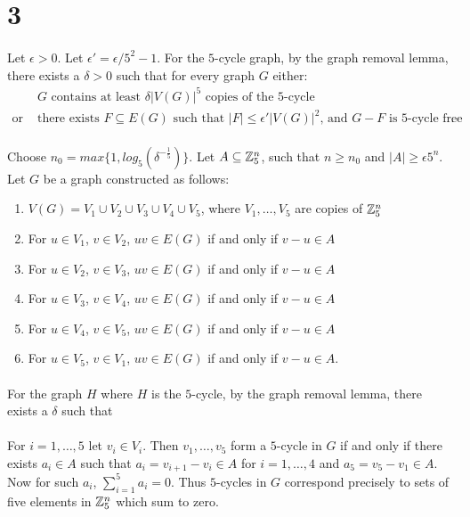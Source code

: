 \documentclass[letterpaper,12pt,oneside,onecolumn]{article}
\begin{document}
\section*{3}
\paragraph{}
Let $\epsilon > 0$. Let $\epsilon' = \epsilon/5^2 - 1$. For the $5$-cycle graph, by the graph removal lemma, there exists a $\delta > 0$ such that for every graph $G$ either: 
\begin{align}
&G \text{ contains at least } \delta |V(G)|^5 \text{ copies of the $5$-cycle} \\
\text{or }&\text{there exists $F \subseteq E(G)$ such that $|F| \leq \epsilon' |V(G)|^2$, and $G - F$ is $5$-cycle free}.
\end{align}
\paragraph{}
Choose $n_0 = max\{1,log_5(\delta^{-\frac{1}{5}})\} $. Let $A \subseteq \mathbb{Z}_5^n$, such that $n \geq n_0$ and $|A| \geq \epsilon 5^n$. Let $G$ be a graph constructed as follows:
\begin{enumerate}
\item $V(G) = V_1 \cup V_2 \cup V_3 \cup V_4 \cup V_5$, where $V_1, \dots, V_5$ are copies of $\mathbb{Z}_5^n$
\item For $u \in V_1$, $v \in V_2$, $uv \in E(G)$ if and only if $v - u \in A$
\item For $u \in V_2$, $v \in V_3$, $uv \in E(G)$ if and only if $v - u \in A$
\item For $u \in V_3$, $v \in V_4$, $uv \in E(G)$ if and only if $v - u \in A$
\item For $u \in V_4$, $v \in V_5$, $uv \in E(G)$ if and only if $v - u \in A$
\item For $u \in V_5$, $v \in V_1$, $uv \in E(G)$ if and only if $v - u \in A$.
\end{enumerate}
\paragraph{}
For the graph $H$ where $H$ is the $5$-cycle, by the graph removal lemma, there exists a $\delta$ such that
\paragraph{}
For $i = 1, \dots, 5$ let $v_i \in V_i$. Then $v_1, \dots, v_5$ form a $5$-cycle in $G$ if and only if there exists $a_i \in A$ such that $a_i = v_{i+1} - v_i \in A$ for $i = 1,\dots, 4$ and $a_5 = v_5 - v_1 \in A$. Now for such $a_i$, $\sum_{i=1}^5 a_i = 0$. Thus $5$-cycles in $G$ correspond precisely to sets of five elements in $\mathbb{Z}_5^n$ which sum to zero.
\end{document}
